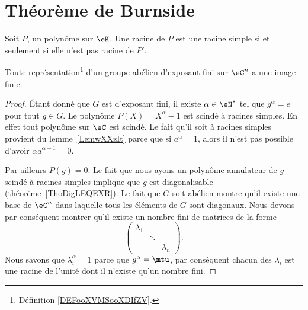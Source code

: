 \section{Théorème de Burnside}

\begin{lemma}       \label{LemwXXzIt}
    Soit \( P\), un polynôme sur \( \eK\). Une racine de \( P\) est une racine simple si et seulement si elle n'est pas racine de \( P'\).
\end{lemma}

\begin{theorem}     \label{ThoBurnsideoPuCtS}
    Toute représentation\footnote{Définition \ref{DEFooXVMSooXDIfZV}.} d'un groupe abélien d'exposant fini sur \( \eC^n\) a une image finie.
\end{theorem}

\begin{proof}
    Étant donné que \( G\) est d'exposant fini, il existe \( \alpha\in \eN^*\) tel que \( g^{\alpha}=e\) pour tout \( g\in G\). Le polynôme \( P(X)=X^{\alpha}-1\) est scindé à racines simples. En effet tout polynôme sur \( \eC\) est scindé. Le fait qu'il soit à racines simples provient du lemme~\ref{LemwXXzIt} parce que si \( a^{\alpha}=1\), alors il n'est pas possible d'avoir \( \alpha a^{\alpha-1}=0\).

    Par ailleurs \( P(g)=0\). Le fait que nous ayons un polynôme annulateur de \( g\) scindé à racines simples implique que \( g\) est diagonalisable (théorème~\ref{ThoDigLEQEXR}). Le fait que \( G\) soit abélien montre qu'il existe une base de \( \eC^n\) dans laquelle tous les éléments de \( G\) sont diagonaux. Nous devons par conséquent montrer qu'il existe un nombre fini de matrices de la forme
    \begin{equation}
        \begin{pmatrix}
            \lambda_1    &       &       \\
                &   \ddots    &       \\
                &       &   \lambda_n
        \end{pmatrix}.
    \end{equation}
    Nous savons que \( \lambda_i^{\alpha}=1\) parce que \( g^{\alpha}=\mtu\), par conséquent chacun des \( \lambda_i\) est une racine de l'unité dont il n'existe qu'un nombre fini.
\end{proof}

